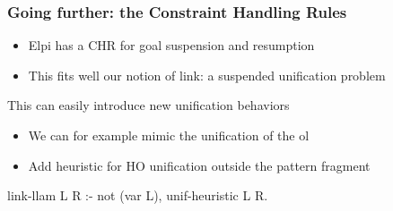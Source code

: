 \documentclass{pres}
\begin{document}

  


\begin{frame}[fragile]
  \frametitle{Going further: the Constraint Handling Rules}

  \begin{itemize}
    \item Elpi has a CHR for goal suspension and resumption
    \item This fits well our notion of link: a suspended unification problem
  \end{itemize}


  \mysep

  This can easily introduce new unification behaviors
  \begin{itemize}
    \item We can for example mimic the unification of the ol
    \item Add heuristic for HO unification outside the pattern fragment
  \end{itemize}

  \mysep

  \begin{elpicode}
    link-llam L R :- not (var L), unif-heuristic L R.
  \end{elpicode}



\end{frame}
\end{document}
